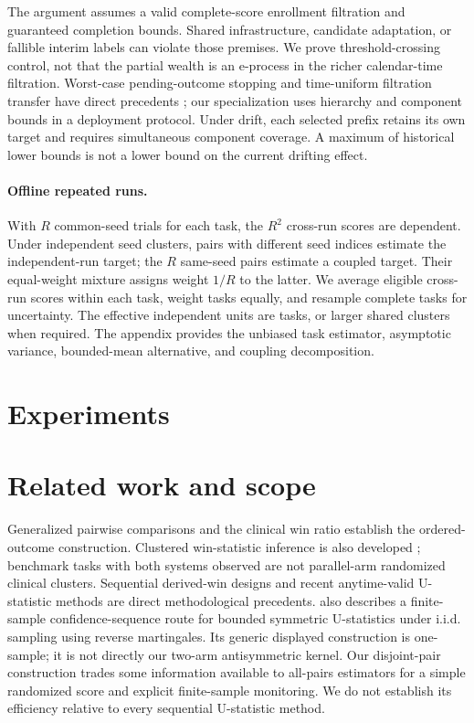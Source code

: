 \documentclass{article}
\begin{document}
The argument assumes a valid complete-score enrollment filtration and
guaranteed completion bounds. Shared infrastructure, candidate adaptation,
or fallible interim labels can violate those premises. We prove
threshold-crossing control, not that the partial wealth is an e-process
in the richer calendar-time filtration. Worst-case pending-outcome
stopping and time-uniform filtration transfer have direct precedents
\citep{henzi2022forecast,henzi2022correction,choe2024filtrations}; our
specialization uses hierarchy and component bounds in a deployment
protocol. Under drift, each selected prefix retains its own target and
requires simultaneous component coverage. A maximum of historical lower
bounds is not a lower bound on the current drifting effect.

\paragraph{Offline repeated runs.}
With $R$ common-seed trials for each task, the $R^2$ cross-run scores are
dependent. Under independent seed clusters, pairs with different seed
indices estimate the independent-run target; the $R$ same-seed pairs
estimate a coupled target. Their equal-weight mixture assigns weight
$1/R$ to the latter. We average eligible cross-run scores within each
task, weight tasks equally, and resample complete tasks for uncertainty.
The effective independent units are tasks, or larger shared clusters
when required. The appendix provides the unbiased task estimator,
asymptotic variance, bounded-mean alternative, and coupling decomposition.

\section{Experiments}
\label{sec:experiments}







\section{Related work and scope}
Generalized pairwise comparisons \citep{buyse2010generalized} and the
clinical win ratio \citep{pocock2012win} establish the ordered-outcome
construction. Clustered win-statistic inference is also developed
\citep{fang2026cluster}; benchmark tasks with both systems observed are
not parallel-arm randomized clinical clusters. Sequential derived-win
designs \citep{zhang2024sequential,bergemann2026group} and recent
anytime-valid U-statistic methods \citep{cai2026ustatistics} are direct
methodological precedents. \citet[Section~4.2]{manole2023martingale}
also describes a finite-sample confidence-sequence route for bounded symmetric
U-statistics under i.i.d. sampling using reverse martingales. Its generic
displayed construction is one-sample; it is not directly our two-arm
antisymmetric kernel. Our disjoint-pair construction trades some
information available to all-pairs estimators for a simple randomized
score and explicit finite-sample monitoring. We do not establish its
efficiency relative to every sequential U-statistic method.
\end{document}
